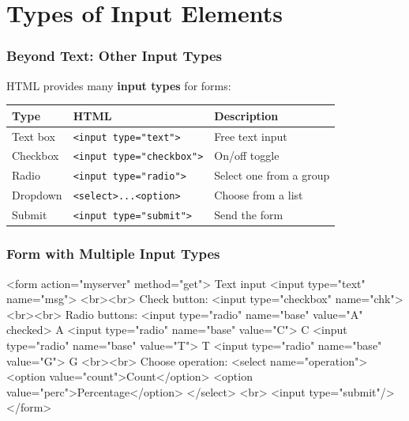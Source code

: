 \documentclass[xcolor=table]{beamer}
\begin{document}

\section{Types of Input Elements}

\begin{frame}[fragile]
\frametitle{Beyond Text: Other Input Types}

HTML provides many \textbf{input types} for forms:

\vspace{0.2cm}

\begingroup\small
\begin{center}
\begin{tabular}{|l|l|l|}
\hline
\textbf{Type} & \textbf{HTML} & \textbf{Description} \\
\hline
Text box & \texttt{<input type="text">} & Free text input \\
\hline
Checkbox & \texttt{<input type="checkbox">} & On/off toggle \\
\hline
Radio & \texttt{<input type="radio">} & Select one from a group \\
\hline
Dropdown & \texttt{<select>...<option>} & Choose from a list \\
\hline
Submit & \texttt{<input type="submit">} & Send the form \\
\hline
\end{tabular}
\end{center}
\endgroup

\end{frame}

\begin{frame}[fragile]
\frametitle{Form with Multiple Input Types}

\begin{htmlcode}[basicstyle=\ttm\scriptsize]
<form action="myserver" method="get">
  Text input
  <input type="text" name="msg">
  <br><br>
  Check button:
  <input type="checkbox" name="chk">
  <br><br>
  Radio buttons:
  <input type="radio" name="base" value="A"
         checked> A
  <input type="radio" name="base" value="C"> C
  <input type="radio" name="base" value="T"> T
  <input type="radio" name="base" value="G"> G
  <br><br>
  Choose operation:
  <select name="operation">
    <option value="count">Count</option>
    <option value="perc">Percentage</option>
  </select>
  <br>
  <input type="submit"/>
</form>
\end{htmlcode}

\end{frame}
\end{document}
